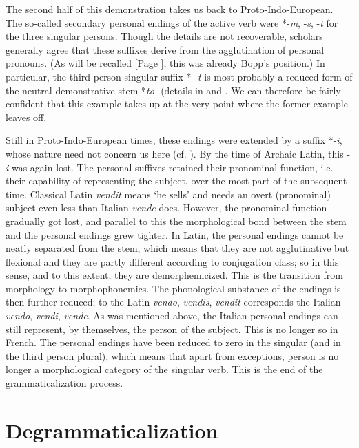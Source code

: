 The second half of this demonstration takes us back to Proto-Indo-European. The so-called secondary personal endings of the active verb were *-\textit{m}, -\textit{s}, -\textit{t} for the three singular persons. Though the details are not recoverable, scholars generally agree that these suffixes derive from the agglutination of personal pronouns. (As will be recalled [Page \pageref{Bopp}], this was already Bopp's position.) In particular, the third person singular suffix *- \textit{t} is most probably a reduced form of the neutral demonstrative stem *\textit{to}{}- (details in \citet[302--305]{Szemerényi1970} and \citet{Seebold1971}. We can therefore be fairly confident that this example takes up at the very point where the former example leaves off.

Still in Proto-Indo-European times, these endings were extended by a suffix *-\textit{i}, whose nature need not concern us here (cf. \pageref{abc}\chk%
). By the time of Archaic Latin, this -\textit{i} was again lost. The personal suffixes retained their pronominal function, i.e. their capability of representing the subject, over the most part of the subsequent time. Classical Latin \textit{vendit} means ‘he sells’ and needs an overt (pronominal) subject even less than Italian \textit{vende} does. However, the pronominal function gradually got lost, and parallel to this the morphological bond between the stem and the personal endings grew tighter. In Latin, the personal endings cannot be neatly separated from the stem, which means that they are not agglutinative but flexional and they are partly different according to conjugation class; so in this sense, and to this extent, they are demorphemicized. This is the transition from morphology to morphophonemics. The phonological substance of the endings is then further reduced; to the Latin \textit{vendo}, \textit{vendis},\textit{ vendit} corresponds the Italian \textit{vendo}, \textit{vendi}, \textit{vende}. As was mentioned above, the Italian personal endings can still represent, by themselves, the person of the subject. This is no longer so in French. The personal endings have been reduced to zero in the singular (and in the third person plural), which means that apart from exceptions, person is no longer a morphological category of the singular verb. This is the end of the grammaticalization process.

\section{Degrammaticalization}

